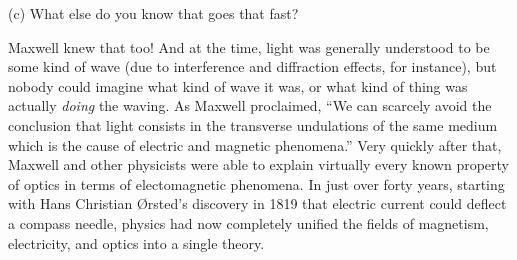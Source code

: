 (c) What else do you know that goes that fast?
\vspace{0.5in}

Maxwell knew that too!  And at the time, light was generally understood to be some kind of wave (due to interference and diffraction effects, for instance), but nobody could imagine what kind of wave it was, or what kind of thing was actually \textit{doing} the waving.  As Maxwell proclaimed, ``We can scarcely avoid the conclusion that light consists in the transverse undulations of the same medium which is the cause of electric and magnetic phenomena.''  Very quickly after that, Maxwell and other physicists were able to explain virtually every known property of optics in terms of electomagnetic phenomena.  In just over forty years, starting with  Hans Christian \O rsted's discovery in 1819 that electric current could deflect a compass needle, physics had now completely unified the fields of magnetism, electricity, and optics into a single theory.  






